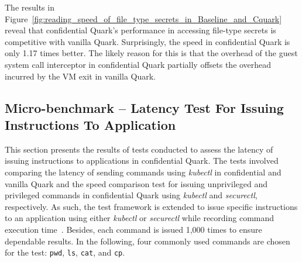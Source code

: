 The results in Figure~\ref{fig:reading_speed_of_file_type_secrets_in_Baseline_and_Cquark} reveal that confidential Quark's performance in accessing file-type secrets is competitive with vanilla Quark. Surprisingly, the speed in 
confidential Quark is only 1.17 times better. The likely reason for this is that the overhead of the guest system call interceptor in confidential Quark partially offsets the overhead incurred by the VM exit in vanilla Quark.

\subsection{Micro-benchmark – Latency Test For Issuing Instructions To Application}
\label{bench_issuing_Instructions}

This section presents the results of tests conducted to assess the latency of issuing instructions to applications in confidential Quark. The tests involved comparing the latency of sending commands using \emph{kubectl} in confidential and vanilla Quark and the speed comparison test for issuing 
unprivileged and privileged commands in confidential Quark using \emph{kubectl} and \emph{securectl}, respectively. As such, the test framework is extended to issue specific instructions to an application using either \emph{kubectl} or \emph{securectl} while recording command execution time~\cite*{benchamark_perf_kubectl}. 
Besides, each command is issued 1,000 times to ensure dependable results. In the following, four commonly used commands are chosen for the test: \texttt{pwd}, \texttt{ls}, \texttt{cat}, and \texttt{cp}.



